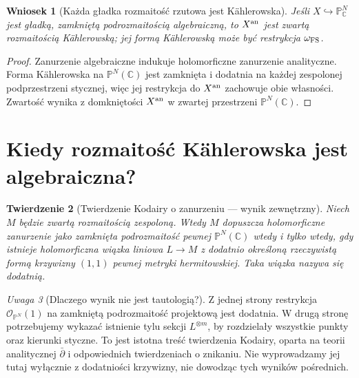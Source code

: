 \documentclass[11pt,a4paper,openany]{report}
\numberwithin{equation}{section}
\theoremstyle{plain}
\newtheorem{twierdzenie}{Twierdzenie}[section]
\newtheorem{wniosek}[twierdzenie]{Wniosek}
\theoremstyle{definition}
\theoremstyle{remark}
\newtheorem{uwaga}[twierdzenie]{Uwaga}
\newcommand{\C}{\mathbb C}
\newcommand{\PP}{\mathbb P}
\begin{document}
\begin{wniosek}[Każda gładka rozmaitość rzutowa jest Kählerowska]
Jeśli $X\hookrightarrow\PP^N_\C$ jest gładką, zamkniętą
podrozmaitością algebraiczną, to $X^{\rm an}$ jest
zwartą rozmaitością Kählerowską; jej formą
Kählerowską może być restrykcja $\omega_{\rm FS}$.
\end{wniosek}
\begin{proof}
Zanurzenie algebraiczne indukuje holomorficzne
zanurzenie analityczne. Forma Kählerowska na
$\PP^N(\C)$ jest zamknięta i dodatnia na
każdej zespolonej podprzestrzeni stycznej, więc
jej restrykcja do $X^{\rm an}$ zachowuje obie własności.
Zwartość wynika z domkniętości $X^{\rm an}$
w zwartej przestrzeni $\PP^N(\C)$.
\end{proof}

\section{Kiedy rozmaitość Kählerowska jest algebraiczna?}
\label{sec:ga9-kodaira}

\begin{twierdzenie}[Twierdzenie Kodairy o zanurzeniu — wynik zewnętrzny]
\label{tw:ga9-kodaira}
Niech $M$ będzie zwartą rozmaitością zespoloną.
Wtedy $M$ dopuszcza holomorficzne zanurzenie jako
zamknięta podrozmaitość pewnej $\PP^N(\C)$ wtedy
i tylko wtedy, gdy istnieje holomorficzna wiązka
liniowa $L\to M$ z dodatnio określoną rzeczywistą
formą krzywizny $(1,1)$ pewnej metryki hermitowskiej.
Taka wiązka nazywa się \emph{dodatnią}.
\end{twierdzenie}

\begin{uwaga}[Dlaczego wynik nie jest tautologią?]
Z jednej strony restrykcja $\mathcal O_{\PP^N}(1)$
na zamkniętą podrozmaitość projektową jest dodatnia.
W drugą stronę potrzebujemy wykazać istnienie tylu
sekcji $L^{\otimes m}$, by rozdzielały wszystkie
punkty oraz kierunki styczne. To jest istotna treść
twierdzenia Kodairy, oparta na teorii analitycznej
$\bar\partial$ i odpowiednich twierdzeniach o znikaniu.
Nie wyprowadzamy jej tutaj wyłącznie z dodatniości
krzywizny, nie dowodząc tych wyników pośrednich.
\end{uwaga}
\end{document}
